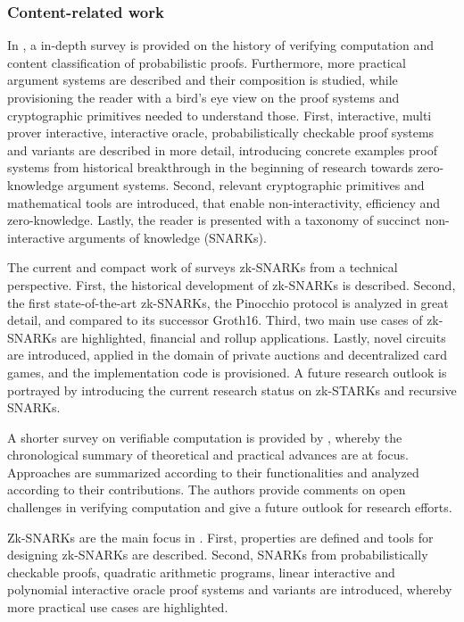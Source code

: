\subsubsection{Content-related work}
In \citet{Thaler}, a in-depth survey is provided on the history of verifying computation and content classification of probabilistic proofs. Furthermore, more practical argument systems are described and their composition is studied, while provisioning the reader with a bird's eye view on the proof systems and cryptographic primitives needed to understand those. First, interactive, multi prover interactive, interactive oracle, probabilistically checkable proof systems and variants are described in more detail, introducing concrete examples proof systems from historical breakthrough in the beginning of research towards zero-knowledge argument systems. Second, relevant cryptographic primitives and mathematical tools are introduced, that enable non-interactivity, efficiency and zero-knowledge. Lastly, the reader is presented with a taxonomy of succinct non-interactive arguments of knowledge (SNARKs).

The current and compact work of \citet{chen2022review} surveys zk-SNARKs from a technical perspective. First, the historical development of zk-SNARKs is described. Second, the first state-of-the-art zk-SNARKs, the Pinocchio protocol is analyzed in great detail, and compared to its successor Groth16. Third, two main use cases of zk-SNARKs are highlighted, financial and rollup applications. Lastly, novel circuits are introduced, applied in the domain of private auctions and decentralized card games, and the implementation code is provisioned. A future research outlook is portrayed by introducing the current research status on zk-STARKs and recursive SNARKs.

A shorter survey on verifiable computation is provided by \citet{Ahmad}, whereby the chronological summary of theoretical and practical advances are at focus. Approaches are summarized according to their functionalities and analyzed according to their contributions. The authors provide comments on open challenges in verifying computation and give a future outlook for research efforts. 

Zk-SNARKs are the main focus in \citet{NitulescuGentleIntroSNARKs}. First, properties are defined and tools for designing zk-SNARKs are described. Second, SNARKs from probabilistically checkable proofs, quadratic arithmetic programs, linear interactive and polynomial interactive oracle proof systems and variants are introduced, whereby more practical use cases are highlighted. 


